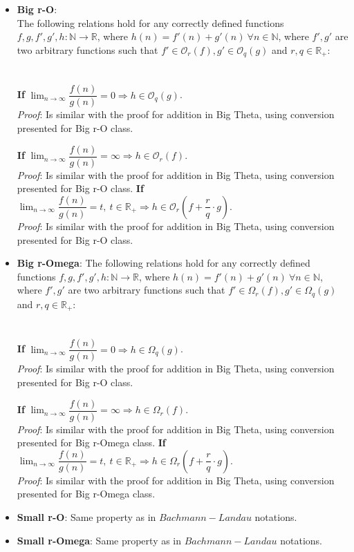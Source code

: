 \begin{itemize}
  \item \textbf{Big r-O}: \\
The following relations hold for any correctly defined functions $f, g, f', g', h:\mathbb{N}\longrightarrow\mathbb{R}$, where $ h(n) = f'(n) + g'(n)\  \forall n \in \mathbb{N} $, where $f',g'$ are two arbitrary functions such that $ f' \in \mathcal{O}_{r}(f),  g' \in \mathcal{O}_{q}(g) $ and $r,q \in \mathbb{R}_{+}$:  
  \\ \\ \\

    \textbf{If} $ \lim_{n\to\infty} \dfrac{f(n)}{g(n)} = 0 \Rightarrow  h \in \mathcal{O}_{q}(g) $. \\
\textit{Proof}: 
Is similar with the proof for addition in Big Theta, using conversion presented for Big r-O class.
\hfill\break

  \textbf{If} $ \lim_{n\to\infty} \dfrac{f(n)}{g(n)} = \infty \Rightarrow  h \in \mathcal{O}_{r}(f) $. \\
  \textit{Proof}:
Is similar with the proof for addition in Big Theta, using conversion presented for Big r-O class.
\hfill\break
  \textbf{If} $ \lim_{n\to\infty} \dfrac{f(n)}{g(n)} = t, \ t \in \mathbb{R}_{+} \Rightarrow  h \in \mathcal{O}_{r} \left( f + \dfrac{r}{q} \cdot g \right) $. \\
  \textit{Proof}:
Is similar with the proof for addition in Big Theta, using conversion presented for Big r-O class.
\hfill\break


  \item \textbf{Big r-Omega}: 
  The following relations hold for any correctly defined functions $f, g, f', g', h:\mathbb{N}\longrightarrow\mathbb{R}$, where $ h(n) = f'(n) + g'(n)\  \forall n \in \mathbb{N} $, where $f',g'$ are two arbitrary functions such that $ f' \in \Omega_{r}(f),  g' \in \Omega_{q}(g) $ and $r,q \in \mathbb{R}_{+}$:  
  \\ \\ \\
    \textbf{If} $ \lim_{n\to\infty} \dfrac{f(n)}{g(n)} = 0 \Rightarrow  h \in \Omega_{q}(g) $. \\
\textit{Proof}:
Is similar with the proof for addition in Big Theta, using conversion presented for Big r-O class.
\hfill\break

  \textbf{If} $ \lim_{n\to\infty} \dfrac{f(n)}{g(n)} = \infty \Rightarrow  h \in \Omega_{r}(f) $. \\
  \textit{Proof}:
Is similar with the proof for addition in Big Theta, using conversion presented for Big r-Omega class.
\hfill\break
  \textbf{If} $ \lim_{n\to\infty} \dfrac{f(n)}{g(n)} = t, \ t \in \mathbb{R}_{+} \Rightarrow  h \in \Omega_{r} \left( f + \dfrac{r}{q} \cdot g \right) $. \\
  \textit{Proof}:
Is similar with the proof for addition in Big Theta, using conversion presented for Big r-Omega class.
\hfill\break

  \item \textbf{Small r-O}:
  Same property as in $Bachmann-Landau$ notations.
  \item \textbf{Small r-Omega}:
  Same property as in $Bachmann-Landau$ notations.
\end{itemize}


